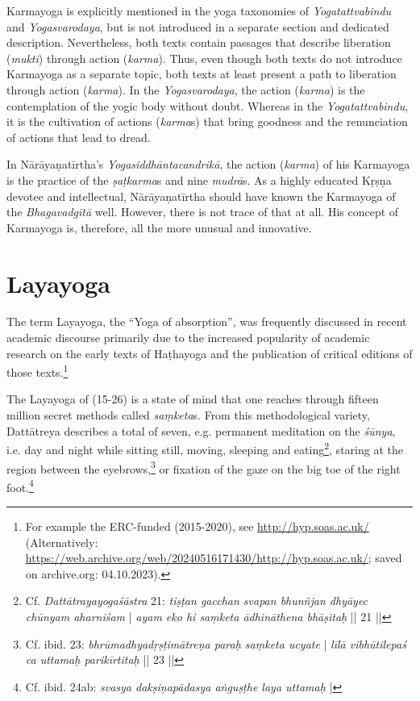 Karmayoga is explicitly mentioned in the yoga taxonomies of \textit{Yogatattvabindu} and \textit{Yogasvarodaya}, but is not introduced in a separate section and dedicated description. Nevertheless, both texts contain passages that describe liberation (\textit{mukti}) through action (\textit{karma}). Thus, even though both texts do not introduce Karmayoga as a separate topic, both texts at least present a path to liberation through action (\textit{karma}). In the \textit{Yogasvarodaya}, the action (\textit{karma}) is the contemplation of the yogic body without doubt. Whereas in the \textit{Yogatattvabindu}, it is the cultivation of actions (\textit{karma}s) that bring goodness and the renunciation of actions that lead to dread. 

In Nārāyaṇatīrtha's \emph{Yogasiddhāntacandrikā}, the action (\textit{karma}) of his Karmayoga is the practice of the \textit{ṣaṭkarma}s and nine \textit{mudrā}s. As a highly educated Kṛṣṇa devotee and intellectual, Nārāyaṇatīrtha should have known the Karmayoga of the \emph{Bhagavadgītā} well. However, there is not trace of that at all. His concept of Karmayoga is, therefore, all the more unusual and innovative.   

\section{Layayoga}
\label{layayogaintro}

The term Layayoga, the ``Yoga of absorption'', was frequently discussed in recent academic discourse primarily due to the increased popularity of academic research on the early texts of Haṭhayoga and the publication of critical editions of those texts.\footnote{For example the ERC-funded  (2015-2020), see \url{http://hyp.soas.ac.uk/} (Alternatively: \url{https://web.archive.org/web/20240516171430/http://hyp.soas.ac.uk/}; saved on archive.org: 04.10.2023).}  

The Layayoga of  (15-26) is a state of mind that one reaches through fifteen million secret methods called \textit{saṃketa}s. From this methodological variety, Dattātreya describes a total of seven, e.g. permanent meditation on the \textit{śūnya}, i.e. day and night while sitting still, moving, sleeping and eating\footnote{Cf. \emph{Dattātrayayogaśāstra} 21: \textit{tiṣṭan gacchan svapan bhunñjan dhyāyec chūnyam aharniśam} | \textit{ayam eko hi saṃketa ādhināthena bhāṣitaḥ} || 21 ||}, staring at the region between the eyebrows,\footnote{Cf. ibid. 23: \textit{bhrūmadhyadṛṣṭimātreṇa paraḥ saṃketa ucyate} | \textit{līlā vibhūtilepaś ca uttamaḥ parikīrtitaḥ} || 23 ||} or fixation of the gaze on the big toe of the right foot.\footnote{Cf. ibid. 24ab: \textit{svasya dakṣiṇapādasya aṅguṣṭhe laya uttamaḥ} |}


